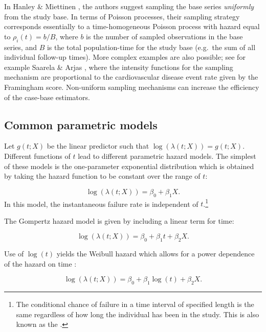 In Hanley \& Miettinen \citeyearpar{hanley2009fitting}, the authors
suggest sampling the base series \emph{uniformly} from the study base.
In terms of Poisson processes, their sampling strategy corresponds
essentially to a time-homogeneous Poisson process with hazard equal to
\(\rho_i(t) = b/B\), where \(b\) is the number of sampled observations
in the base series, and \(B\) is the total population-time for the study
base (e.g.~the sum of all individual follow-up times). More complex
examples are also possible; see for example Saarela \& Arjas
\citeyearpar{saarela2015non}, where the intensity functions for the
sampling mechanism are proportional to the cardiovascular disease event
rate given by the Framingham score. Non-uniform sampling mechanisms can
increase the efficiency of the case-base estimators.

\hypertarget{common-parametric-models}{%
\subsection{Common parametric models}\label{common-parametric-models}}

Let \(g(t; X)\) be the linear predictor such that
\(\log(\lambda(t;X)) = g(t; X)\). Different functions of \(t\) lead to
different parametric hazard models. The simplest of these models is the
one-parameter exponential distribution which is obtained by taking the
hazard function to be constant over the range of \(t\):

\begin{equation}
\log(\lambda(t; X)) = \beta_0 + \beta_1 X. \label{eq:exp}
\end{equation} In this model, the instantaneous failure rate is
independent of
\(t\).\footnote{The conditional chance of failure in a time interval of specified length is the same regardless of how long the individual has been in the study. This is also known as the  \citep{kalbfleisch2011statistical}.}

The Gompertz hazard model is given by including a linear term for time:

\begin{equation}
\log(\lambda(t; X)) = \beta_0 + \beta_1 t + \beta_2 X. \label{eq:gomp}
\end{equation}

Use of \(\log(t)\) yields the Weibull hazard which allows for a power
dependence of the hazard on time \citep{kalbfleisch2011statistical}:

\begin{equation}
\log(\lambda(t; X)) = \beta_0 + \beta_1 \log(t) + \beta_2 X. \label{eq:weibull}
\end{equation}


